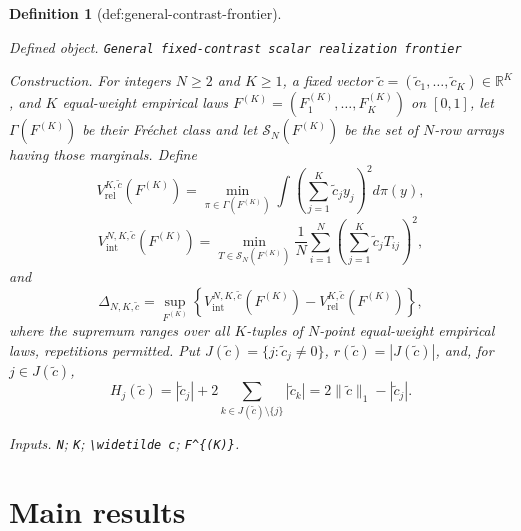 \documentclass{article}
\newtheorem{definition}{Definition}
\begin{document}
\begin{definition}[def:general-contrast-frontier]\label{def:general-contrast-frontier}
\par\smallskip\noindent\emph{Defined object.} \texttt{General fixed-\allowbreak{}contrast scalar realization frontier}
\par\smallskip\noindent\emph{Construction.} For integers \(N\ge2\) and \(K\ge1\), a fixed vector \(\widetilde c=(\widetilde c_1,\ldots,\widetilde c_K)\in\mathbb R^K\), and \(K\) equal-weight empirical laws \(F^{(K)}=(F^{(K)}_1,\ldots,F^{(K)}_K)\) on \([0,1]\), let \(\Gamma(F^{(K)})\) be their Fr\'{e}chet class and let \(\mathcal S_N(F^{(K)})\) be the set of \(N\)-row arrays having those marginals.  Define
\[
 V_{\mathrm{rel}}^{K,\widetilde c}(F^{(K)})
 =\min_{\pi\in\Gamma(F^{(K)})}
 \int\left(\sum_{j=1}^K\widetilde c_jy_j\right)^2d\pi(y),
\]
\[
 V_{\mathrm{int}}^{N,K,\widetilde c}(F^{(K)})
 =\min_{T\in\mathcal S_N(F^{(K)})}
 \frac1N\sum_{i=1}^N\left(\sum_{j=1}^K\widetilde c_jT_{ij}\right)^2,
\]
and
\[
 \Delta_{N,K,\widetilde c}
 =\sup_{F^{(K)}}\left\{
 V_{\mathrm{int}}^{N,K,\widetilde c}(F^{(K)})-
 V_{\mathrm{rel}}^{K,\widetilde c}(F^{(K)})\right\},
\]
where the supremum ranges over all \(K\)-tuples of \(N\)-point equal-weight empirical laws, repetitions permitted.  Put \(J(\widetilde c)=\{j:\widetilde c_j\ne0\}\), \(r(\widetilde c)=|J(\widetilde c)|\), and, for \(j\in J(\widetilde c)\),
\[
 H_j(\widetilde c)=|\widetilde c_j|+2\sum_{k\in J(\widetilde c)\setminus\{j\}}|\widetilde c_k|
 =2\|\widetilde c\|_1-|\widetilde c_j|.
\]
\par\smallskip\noindent\emph{Inputs.} \texttt{N}; \texttt{K}; \texttt{\textbackslash{}\allowbreak{}widetilde c}; \texttt{F\textasciicircum{}\{(K)\}\allowbreak{}}.
\end{definition}

\section{Main results}
\end{document}
